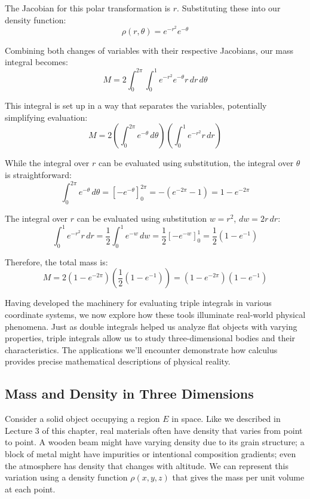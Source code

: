 \begin{example}
\begin{solution}
\noindent The Jacobian for this polar transformation is \(r\). Substituting these into our density function:
\[
\rho(r,\theta) = e^{-r^2} e^{-\theta}
\]

\noindent Combining both changes of variables with their respective Jacobians, our mass integral becomes:
\[
M = 2 \int_0^{2\pi} \int_0^1 e^{-r^2} e^{-\theta} r \, dr \, d\theta
\]

\noindent This integral is set up in a way that separates the variables, potentially simplifying evaluation:
\[
M = 2 \left( \int_0^{2\pi} e^{-\theta} \, d\theta \right) \left( \int_0^1 e^{-r^2} r \, dr \right)
\]

\noindent While the integral over \(r\) can be evaluated using substitution, the integral over \(\theta\) is straightforward:
\[
\int_0^{2\pi} e^{-\theta} \, d\theta = \left[ -e^{-\theta} \right]_0^{2\pi} = -(e^{-2\pi} - 1) = 1 - e^{-2\pi}
\]

\noindent The integral over \(r\) can be evaluated using substitution \(w = r^2\), \(dw = 2r\,dr\):
\[
\int_0^1 e^{-r^2} r \, dr = \frac{1}{2} \int_0^1 e^{-w} \, dw = \frac{1}{2} \left[ -e^{-w} \right]_0^1 = \frac{1}{2} (1 - e^{-1})
\]

\noindent Therefore, the total mass is:
\[
M = 2 \left(1 - e^{-2\pi}\right) \left( \frac{1}{2} \left(1 - e^{-1}\right) \right) = \left(1 - e^{-2\pi}\right) \left(1 - e^{-1}\right)
\]
\end{solution}
\end{example}
\exampleline




\newpage


\noindent Having developed the machinery for evaluating triple integrals in various coordinate systems, we now explore how these tools illuminate real-world physical phenomena. Just as double integrals helped us analyze flat objects with varying properties, triple integrals allow us to study three-dimensional bodies and their characteristics. The applications we'll encounter demonstrate how calculus provides precise mathematical descriptions of physical reality.

\subsection*{Mass and Density in Three Dimensions} 

\noindent Consider a solid object occupying a region $E$ in space. Like we described in Lecture 3 of this chapter, real materials often have density that varies from point to point. A wooden beam might have varying density due to its grain structure; a block of metal might have impurities or intentional composition gradients; even the atmosphere has density that changes with altitude. We can represent this variation using a density function $\rho(x,y,z)$ that gives the mass per unit volume at each point. \\

